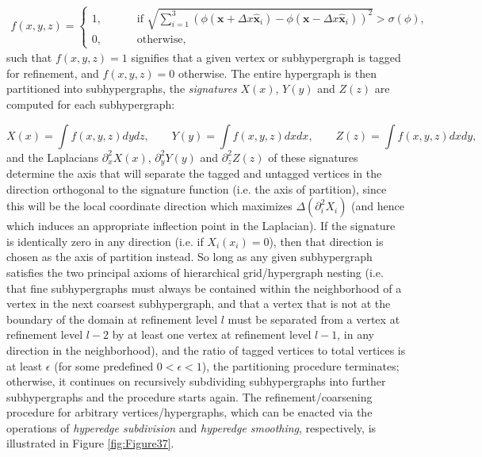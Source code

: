 \documentclass{article}
\begin{document}
\begin{align}
f \left( x, y, z \right) = \begin{cases}
1, \qquad &\text{ if } \sqrt{\sum\limits_{i = 1}^{3} \left( \phi \left( \mathbf{x} + \Delta x \hat{\mathbf{x}}_i \right) - \phi \left( \mathbf{x} - \Delta x \hat{\mathbf{x}}_i \right) \right)^2} > \sigma \left( \phi \right),\\
0, \qquad &\text{ otherwise},
\end{cases}
\end{align}
such that ${f \left( x, y, z \right) = 1}$ signifies that a given vertex or subhypergraph is tagged for refinement, and ${f \left( x, y, z \right) = 0}$ otherwise. The entire hypergraph is then partitioned into subhypergraphs, the \textit{signatures} ${X \left( x \right)}$, ${Y \left( y \right)}$ and ${Z \left( z \right)}$ are computed for each subhypergraph:

\begin{equation}
X \left( x \right) = \int f \left( x, y, z \right) dy dz, \qquad Y \left( y \right) = \int f \left( x, y, z \right) dx dx, \qquad Z \left( z \right) = \int f \left( x, y, z \right) dx dy,
\end{equation}
and the Laplacians ${\partial_{x}^{2} X \left( x \right)}$, ${\partial_{y}^{2} Y \left( y \right)}$ and ${\partial_{z}^{2} Z \left( z \right)}$ of these signatures determine the axis that will separate the tagged and untagged vertices in the direction orthogonal to the signature function (i.e. the axis of partition), since this will be the local coordinate direction which maximizes ${\Delta \left( \partial_{i}^{2} X_i \right)}$ (and hence which induces an appropriate inflection point in the Laplacian). If the signature is identically zero in any direction (i.e. if ${X_i \left( x_i \right) = 0}$), then that direction is chosen as the axis of partition instead. So long as any given subhypergraph satisfies the two principal axioms of hierarchical grid/hypergraph nesting (i.e. that fine subhypergraphs must always be contained within the neighborhood of a vertex in the next coarsest subhypergraph, and that a vertex that is not at the boundary of the domain at refinement level $l$ must be separated from a vertex at refinement level ${l - 2}$ by at least one vertex at refinement level ${l - 1}$, in any direction in the neighborhood), and the ratio of tagged vertices to total vertices is at least ${\epsilon}$ (for some predefined ${0 < \epsilon < 1}$), the partitioning procedure terminates; otherwise, it continues on recursively subdividing subhypergraphs into further subhypergraphs and the procedure starts again. The refinement/coarsening procedure for arbitrary vertices/hypergraphs, which can be enacted via the operations of \textit{hyperedge subdivision} and \textit{hyperedge smoothing}, respectively, is illustrated in Figure \ref{fig:Figure37}.
\end{document}
